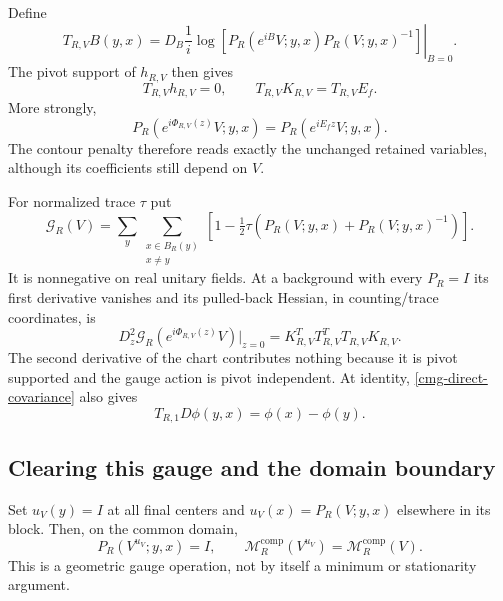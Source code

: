 Define
\begin{equation}
 T_{R,V}B(y,x)=
 D_B\left.\frac1i\log[
 P_R(e^{iB}V;y,x)P_R(V;y,x)^{-1}]\right|_{B=0}.
 \label{cmg-T-definition}
\end{equation}
The pivot support of $h_{R,V}$ then gives
\begin{equation}
 T_{R,V}h_{R,V}=0,\qquad
 T_{R,V}K_{R,V}=T_{R,V}E_f.
 \label{cmg-T-identities}
\end{equation}
More strongly,
\begin{equation}
 P_R(e^{i\Phi_{R,V}(z)}V;y,x)
       =P_R(e^{iE_fz}V;y,x).
 \label{cmg-gauge-retained}
\end{equation}
The contour penalty therefore reads exactly the unchanged retained
variables, although its coefficients still depend on $V$.

For normalized trace $\tau$ put
\begin{equation}
 \mathcal G_R(V)=\sum_y\sum_{\substack{x\in B_R(y)\\x\ne y}}
       \left[1-\tfrac12\tau(P_R(V;y,x)+P_R(V;y,x)^{-1})\right].
 \label{cmg-gauge-action}
\end{equation}
It is nonnegative on real unitary fields. At a background with every
$P_R=I$ its first derivative vanishes and its pulled-back Hessian,
in counting/trace coordinates, is
\begin{equation}
 D_z^2\mathcal G_R(e^{i\Phi_{R,V}(z)}V)\big|_{z=0}
       =K_{R,V}^{T}T_{R,V}^{T}T_{R,V}K_{R,V}.
 \label{cmg-gauge-hessian}
\end{equation}
The second derivative of the chart contributes nothing because it
is pivot supported and the gauge action is pivot independent. At
identity, \eqref{cmg-direct-covariance} also gives
\begin{equation}
 T_{R,1}D\phi(y,x)=\phi(x)-\phi(y).
 \label{cmg-T-gradient}
\end{equation}

\subsection{Clearing this gauge and the domain boundary}
\label{cmg-clearing-section}

Set $u_V(y)=I$ at all final centers and
$u_V(x)=P_R(V;y,x)$ elsewhere in its block. Then, on the common
domain,
\begin{equation}
 P_R(V^{u_V};y,x)=I,\qquad
 \mathcal M_R^{\mathrm{comp}}(V^{u_V})
       =\mathcal M_R^{\mathrm{comp}}(V).
 \label{cmg-clearing}
\end{equation}
This is a geometric gauge operation, not by itself a minimum or
stationarity argument.

